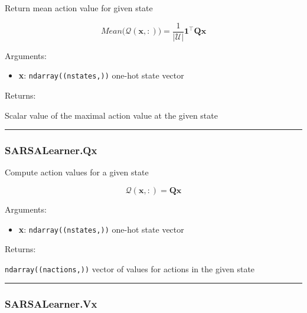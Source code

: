 Return mean action value for given state

\[
Mean \big(\mathcal Q(\mathbf x, :)\big) = \frac{1}{|\mathcal U|} \mathbf 1^\top \mathbf Q \mathbf x
\]

Arguments:

\begin{itemize}
\tightlist
\item
  \textbf{x}: \texttt{ndarray((nstates,))} one-hot state vector
\end{itemize}

Returns:

Scalar value of the maximal action value at the given state

\begin{center}\rule{0.5\linewidth}{\linethickness}\end{center}

\hypertarget{sarsalearner.qx}{%
\subsubsection{SARSALearner.Qx}\label{sarsalearner.qx}}

\begin{Shaded}
\begin{Highlighting}[]
\end{Highlighting}
\end{Shaded}

Compute action values for a given state

\[
\mathcal Q(\mathbf x, :) = \mathbf Q \mathbf x
\]

Arguments:

\begin{itemize}
\tightlist
\item
  \textbf{x}: \texttt{ndarray((nstates,))} one-hot state vector
\end{itemize}

Returns:

\texttt{ndarray((nactions,))} vector of values for actions in the given
state

\begin{center}\rule{0.5\linewidth}{\linethickness}\end{center}

\hypertarget{sarsalearner.vx}{%
\subsubsection{SARSALearner.Vx}\label{sarsalearner.vx}}

